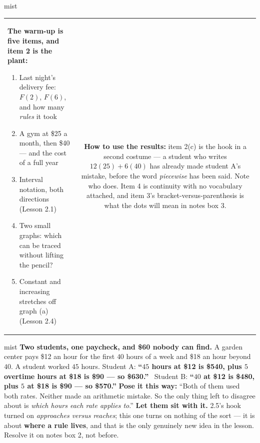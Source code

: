 \documentclass[10pt]{article}
\begin{document}
\begin{fixedskillbox}{mist}
\begin{tabularx}{\linewidth}{@{}X c@{}}
\begin{minipage}[t]{0.55\linewidth}\vspace{0pt}
\textbf{The warm-up is five items, and item 2 is the plant:}
\begin{enumerate}[leftmargin=1.4em, itemsep=1pt, topsep=2pt]
  \item Last night's delivery fee: $F(2)$, $F(6)$, and how many \emph{rules} it took
  \item A gym at \$25 a month, then \$40 --- and the cost of a full year
  \item Interval notation, both directions (Lesson 2.1)
  \item Two small graphs: which can be traced without lifting the pencil?
  \item Constant and increasing stretches off graph (a) (Lesson 2.4)
\end{enumerate}
\end{minipage}
&
\begin{minipage}[t]{0.38\linewidth}\vspace{0pt}
\textbf{How to use the results:} item 2(c) is the hook in a second costume --- a student who writes
$12(25)+6(40)$ has already made student A's mistake, before the word \emph{piecewise} has been said.
Note who does. Item 4 is continuity with no vocabulary attached, and item 3's bracket-versus-paren\-thesis
is what the dots will mean in notes box 3.
\end{minipage}
\end{tabularx}
\end{fixedskillbox}

\begin{skillbox}[Hook]{mist}
\textbf{Two students, one paycheck, and \$60 nobody can find.} A garden center pays \$12 an hour for
the first $40$ hours of a week and \$18 an hour beyond $40$. A student worked $45$ hours. \quad
Student A: \textbf{``$45$ hours at \$12 is \$540, plus $5$ overtime hours at \$18 is \$90 --- so
\$630.''} \ Student B: \textbf{``$40$ at \$12 is \$480, plus $5$ at \$18 is \$90 --- so \$570.''}
\textbf{Pose it this way:} ``Both of them used both rates. Neither made an arithmetic mistake. So
the only thing left to disagree about is \emph{which hours each rate applies to}.'' \textbf{Let them
sit with it.} 2.5's hook turned on \emph{approaches versus reaches}; this one turns on nothing of the
sort --- it is about \textbf{where a rule lives}, and that is the only genuinely new idea in the
lesson. Resolve it on notes box 2, not before.
\end{skillbox}
\end{document}
